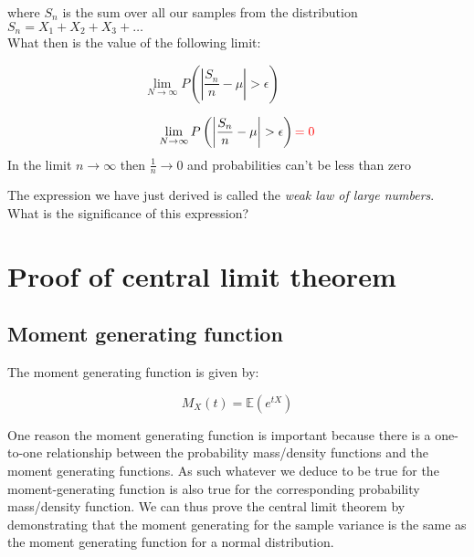 \documentclass[paper=a4, fontsize=11pt]{scrartcl}
\newcommand{\red}[1]{{\color{red}#1}}
\numberwithin{equation}{section}
\numberwithin{figure}{section}
\numberwithin{table}{section}
\begin{document}
\noindent where $S_n$ is the sum over all our samples from the distribution
$S_n = X_1 + X_2 + X_3 + \dots$ \\

\noindent What then is the value of the following limit:

\begin{questions}
\begin{equation}
 \lim_{N \rightarrow \infty} P\left( \left | \frac{S_n}{n} - \mu \right | >
\epsilon \right) \qquad \qquad
\end{equation} 
\end{questions}

\begin{answers}
\begin{equation}
 \lim_{N \rightarrow \infty} P\left( \left | \frac{S_n}{n} - \mu \right | >
\epsilon \right) \red{=0}
\end{equation} 
\red{
In the limit $n\rightarrow\infty$ then $\frac{1}{n}\rightarrow 0$ and
probabilities can't be less than zero
}
\vspace{0.25cm}
\end{answers}

\noindent The expression we have just derived is called the \emph{weak law of
large numbers}.  What is the significance of this expression? 

\vspace{3cm}

\section{Proof of central limit theorem}

\subsection{Moment generating function}

The moment generating function is given by:

\begin{equation}
 M_X(t) = \mathbb{E}(e^{tX})
\end{equation}

\noindent One reason the moment generating function is important because there is a one-to-one relationship between the probability mass/density functions and the
moment generating functions.  As such whatever we deduce to be true for the moment-generating function is also true for the corresponding probability
mass/density function.  We can thus prove the central limit theorem by demonstrating that the moment generating for the sample variance is the same as
the moment generating function for a normal distribution.  
\end{document}
